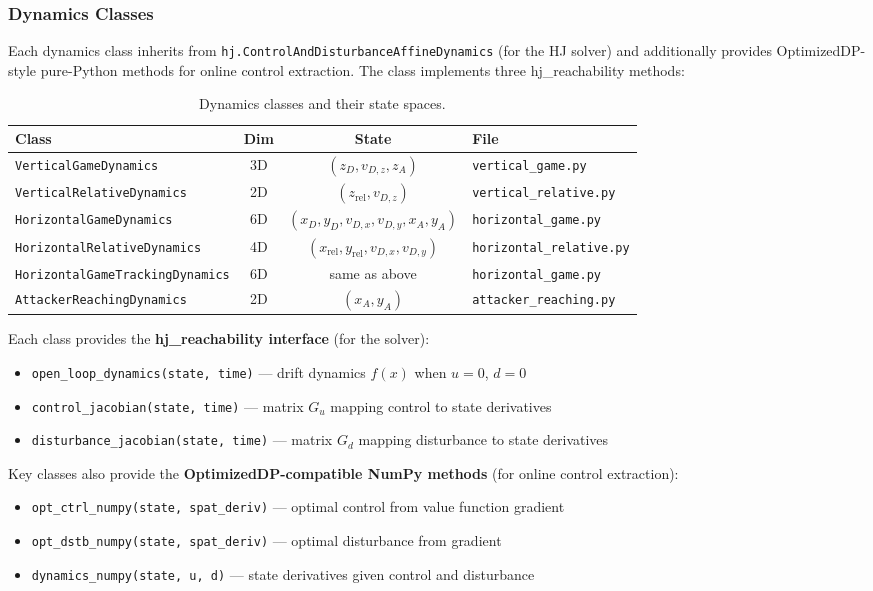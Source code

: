 \documentclass[11pt,a4paper]{article}
\begin{document}
\subsubsection{Dynamics Classes}

Each dynamics class inherits from \texttt{hj.ControlAndDisturbanceAffineDynamics} (for the HJ solver) and additionally provides OptimizedDP-style pure-Python methods for online control extraction. The class implements three hj\_reachability methods:

\begin{table}[h]
\centering
\caption{Dynamics classes and their state spaces.}
\begin{tabular}{lccl}
\toprule
\textbf{Class} & \textbf{Dim} & \textbf{State} & \textbf{File} \\
\midrule
\texttt{VerticalGameDynamics} & 3D & $(z_D, v_{D,z}, z_A)$ & \texttt{vertical\_game.py} \\
\texttt{VerticalRelativeDynamics} & 2D & $(z_\text{rel}, v_{D,z})$ & \texttt{vertical\_relative.py} \\
\texttt{HorizontalGameDynamics} & 6D & $(x_D, y_D, v_{D,x}, v_{D,y}, x_A, y_A)$ & \texttt{horizontal\_game.py} \\
\texttt{HorizontalRelativeDynamics} & 4D & $(x_\text{rel}, y_\text{rel}, v_{D,x}, v_{D,y})$ & \texttt{horizontal\_relative.py} \\
\texttt{HorizontalGameTrackingDynamics} & 6D & same as above & \texttt{horizontal\_game.py} \\
\texttt{AttackerReachingDynamics} & 2D & $(x_A, y_A)$ & \texttt{attacker\_reaching.py} \\
\bottomrule
\end{tabular}
\end{table}

Each class provides the \textbf{hj\_reachability interface} (for the solver):
\begin{itemize}
    \item \texttt{open\_loop\_dynamics(state, time)} --- drift dynamics $f(x)$ when $u = 0$, $d = 0$
    \item \texttt{control\_jacobian(state, time)} --- matrix $G_u$ mapping control to state derivatives
    \item \texttt{disturbance\_jacobian(state, time)} --- matrix $G_d$ mapping disturbance to state derivatives
\end{itemize}

Key classes also provide the \textbf{OptimizedDP-compatible NumPy methods} (for online control extraction):
\begin{itemize}
    \item \texttt{opt\_ctrl\_numpy(state, spat\_deriv)} --- optimal control from value function gradient
    \item \texttt{opt\_dstb\_numpy(state, spat\_deriv)} --- optimal disturbance from gradient
    \item \texttt{dynamics\_numpy(state, u, d)} --- state derivatives given control and disturbance
\end{itemize}
\end{document}
